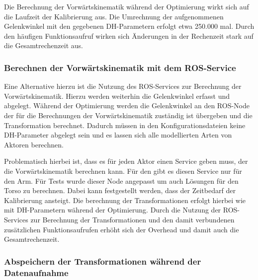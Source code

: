 Die Berechnung der Vorwärtskinematik während der Optimierung wirkt sich auf die 
Laufzeit der Kalibrierung aus. Die Umrechnung der aufgenommenen Gelenkwinkel mit 
den gegebenen \ac{DH-Parameter}n erfolgt etwa 250.000 mal. Durch den häufigen 
Funktionsaufruf wirken sich Änderungen in der Rechenzeit stark auf die 
Gesamtrechenzeit aus.

\subsubsection{Berechnen der Vorwärtskinematik mit dem ROS-Service} %

\label{ssub:Berechnen der Vorwärtskinematik mit dem ROS-Service}

Eine Alternative hierzu ist die Nutzung des ROS-Services zur Berechnung der Vorwärtskinematik.
Hierzu werden weiterhin die Gelenkwinkel erfasst und abgelegt. Während der Optimierung werden
die Gelenkwinkel an den ROS-Node der für die Berechnungen der Vorwärtskinematik zuständig ist 
übergeben und die Transformation berechnet. Dadurch müssen in den Konfigurationsdateien keine
\ac{DH-Parameter} abgelegt sein und es lassen sich alle modellierten Arten von Aktoren berechnen.

Problematisch hierbei ist, dass es für jeden Aktor einen Service geben muss, der die 
Vorwärtskinematik berechnen kann. Für den \cob gibt es diesen Service nur für den Arm.
Für Tests wurde dieser Node angepasst um auch Lösungen für den Torso zu berechnen.
Dabei kann festgestellt werden, dass der Zeitbedarf der Kalibrierung ansteigt.
Die berechnung der Transformationen erfolgt hierbei wie mit \ac{DH-Parameter}n
während der Optimierung. Durch die Nutzung der \ac{ROS}-Services zur Berechnung 
der Transformationen und den damit verbundenen zusätzlichen Funktionsaufrufen 
erhöht sich der Overhead und damit auch die Gesamtrechenzeit. 


\subsubsection{Abspeichern der Transformationen während der Datenaufnahme} %
\label{ssub:Abspeichern der Transformationen während der Datenaufnahme}


